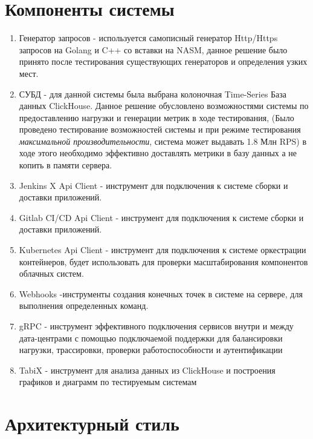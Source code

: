 \documentclass[PI,LAB]{HSEUniversity}
\begin{document}
\section {Компоненты системы}
\begin{enumerate}
	\item Генератор запросов - используется самописный генератор Http/Https запросов на Golang и C++ со вставки на NASM, данное решение было принято после тестирования существующих генераторов и определения узких мест.
	\item СУБД - для данной системы была выбрана колоночная Time-Series База данных ClickHouse. Данное решение обусловлено  возможностями системы по предоставлению нагрузки и генерации метрик в ходе тестирования, (Было проведено  тестирование возможностей системы и при режиме тестирования \emph{максимальной производительности}, система может выдавать 1.8 Млн RPS) в ходе этого необходимо эффективно доставлять метрики в базу данных а не копить в памяти сервера.
	\item Jenkins X Api Client - инструмент для подключения к  системе сборки и доставки приложений.
	\item  Gitlab CI/CD  Api Client - инструмент для подключения к  системе сборки и доставки приложений.
	\item Kubernetes Api Client - инструмент для подключения к системе оркестрации контейнеров, будет использовать для проверки масштабирования компонентов облачных систем.
	\item Webhooks -инструменты создания конечных точек в системе на сервере, для выполнения определенных команд.
	\item gRPC - инструмент эффективного подключения сервисов внутри и между дата-центрами с помощью подключаемой поддержки для балансировки нагрузки, трассировки, проверки работоспособности и аутентификации
	\item TabiX - инструмент для анализа данных из ClickHouse и построения графиков и диаграмм по тестируемым системам
\end{enumerate}


\section {Архитектурный стиль}
\end{document}
